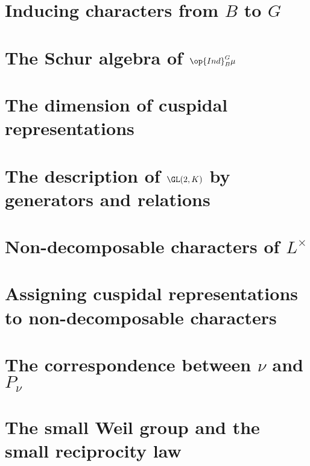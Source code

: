 \documentclass[../main.tex]{subfiles}
\begin{document}
\section{Inducing characters from \texorpdfstring{$B$}{ B} to \texorpdfstring{$G$}{ G}}

\section{The Schur algebra of \texorpdfstring{$\op{Ind}^G_B\mu$}{ Ind mu}}

\section{The dimension of cuspidal representations}

\section{The description of \texorpdfstring{$\GL(2,K)$}{ GL(2,K)} by generators and relations}

\section{Non-decomposable characters of \texorpdfstring{$L^\times$}{ L*}}

\section{Assigning cuspidal representations to non-decomposable characters}

\section{The correspondence between \texorpdfstring{$\nu$}{ v} and \texorpdfstring{$P_\nu$}{ Pv}}

\section{The small Weil group and the small reciprocity law}
\end{document}
